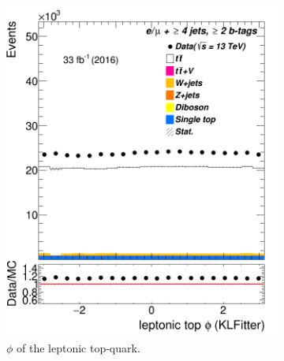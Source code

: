 \begin{figure}
\begin{subfigure}{0.35\textwidth}
		\includegraphics[width=\linewidth]{ControlPlots_emujets_2016_4incl_2incl/klf_topLep_phi_emujets_2016.png}
		\caption{$\phi$ of the leptonic top-quark.} \label{fig:27}
	\end{subfigure}
	\hspace*{1.5cm}
	\begin{subfigure}{0.35\textwidth}

\end{subfigure}
\end{figure}
